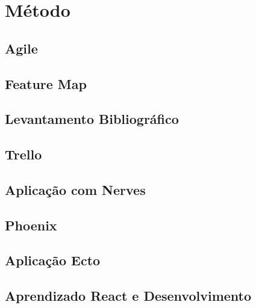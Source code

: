 \documentclass[../../layout.tex]{subfiles}
\begin{document}
\chapter{Método}
\hspace*{3em}\blindtext[1]
\section{Agile}
\hspace*{3em}\blindtext[1]
\section{Feature Map}
\hspace*{3em}\blindtext[1]
\section{Levantamento Bibliográfico}
\hspace*{3em}\blindtext[2]
\hspace*{3em}\blindtext[3]
\section{Trello}
\hspace*{3em}\blindtext[1]
\section{Aplicação com Nerves}
\hspace*{3em}\blindtext[1]
\section{Phoenix}
\hspace*{3em}\blindtext[1]
\section{Aplicação Ecto}
\hspace*{3em}\blindtext[1]
\section{Aprendizado React e Desenvolvimento}
\blindtext
\end{document}

